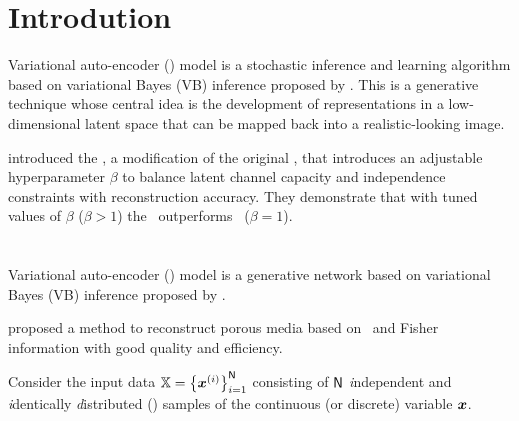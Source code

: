 \section{Introdution}

Variational auto-encoder (\VAE) model is a stochastic inference and learning algorithm based on variational Bayes (VB) inference proposed by \cite{kingma2014}.
This is a generative technique whose central idea is the development of representations in a low-dimensional latent space that can be mapped back into a realistic-looking image.

\cite{Higgins2016betaVAELB} introduced the \bVAE, a modification of the original \VAE, that introduces an adjustable hyperparameter $\beta$ to balance latent channel capacity and independence constraints with reconstruction accuracy.
They demonstrate that with tuned values of $\beta$ ($\beta>1$) the \bVAE\ outperforms \VAE\ ($\beta=1$).
\section{\cite{Zhang2022}}

Variational auto-encoder (\VAE) model is a generative network based on variational Bayes (VB) inference proposed by \cite{kingma2014}.

\cite{Zhang2022} proposed a method to reconstruct porous media based on \VAE\ and Fisher information with good quality and efficiency.

Consider the input data $\mathbb{X} = \left\{ \boldsymbol{x}^{(i)} \right\}_{i=1}^{\mathsf{N}}$ consisting of $\mathsf{N}$
\textit{i}ndependent and \textit{i}dentically \textit{d}istributed (\iid) samples of the continuous (or discrete) variable $\boldsymbol{x}$.

\begin{figure}[H]
 \centering
 
\end{figure}

